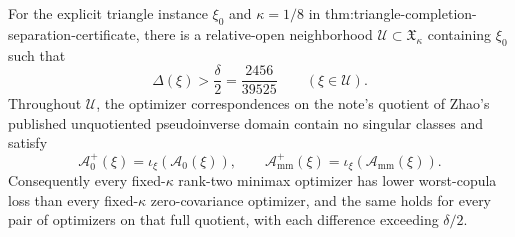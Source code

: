 For the explicit triangle instance \(\xi_0\) and \(\kappa=1/8\) in thm:triangle-completion-separation-certificate, there is a relative-open neighborhood \(\mathcal U\subset\mathfrak X_\kappa\) containing \(\xi_0\) such that
\[
\Delta(\xi)>\frac{\delta}{2}=\frac{2456}{39525}
\qquad(\xi\in\mathcal U).
\]
Throughout \(\mathcal U\), the optimizer correspondences on the note's quotient of Zhao's published unquotiented pseudoinverse domain contain no singular classes and satisfy
\[
\mathcal A_0^+(\xi)=\iota_\xi(\mathcal A_0(\xi)),
\qquad
\mathcal A_{\mathrm{mm}}^+(\xi)=\iota_\xi(\mathcal A_{\mathrm{mm}}(\xi)).
\]
Consequently every fixed-\(\kappa\) rank-two minimax optimizer has lower worst-copula loss than every fixed-\(\kappa\) zero-covariance optimizer, and the same holds for every pair of optimizers on that full quotient, with each difference exceeding \(\delta/2\).